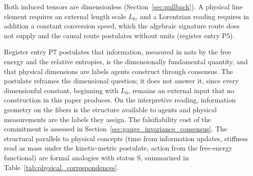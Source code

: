 \documentclass[11pt]{article}
\begin{document}
Both induced tensors are dimensionless (Section~\ref{sec:pullback}). A physical line element requires an external length scale $L_0$, and a Lorentzian reading requires in addition a constant conversion speed, which the algebraic signature route does not supply and the causal route postulates without units (register entry P5).

Register entry P7 postulates that information, measured in nats by the free energy and the relative entropies, is the dimensionally fundamental quantity, and that physical dimensions are labels agents construct through consensus. The postulate reframes the dimensional question; it does not answer it, since every dimensionful constant, beginning with $L_0$, remains an external input that no construction in this paper produces. On the interpretive reading, information geometry on the fibers is the structure available to agents and physical measurements are the labels they assign. The falsifiability cost of the commitment is assessed in Section~\ref{sec:gauge_invariance_consensus}. The structural parallels to physical concepts (time from information updates, stiffness read as mass under the kinetic-metric postulate, action from the free-energy functional) are formal analogies with status S, summarized in Table~\ref{tab:physical_correspondences}.
\end{document}

